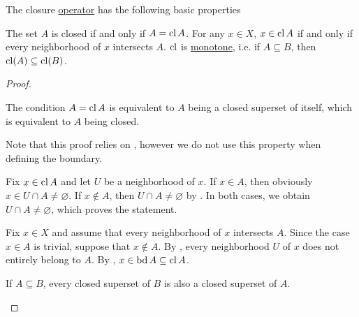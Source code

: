 \begin{proposition}\label{thm:closure_operator_properties}
  The closure \hyperref[def:closure_operator]{operator} has the following basic properties
  \begin{propenum}
     The set \( A \) is closed if and only if \( A = \operatorname{cl} A \).
     For any \( x \in X \), \( x \in \operatorname{cl} A \) if and only if every neighborhood of \( x \) intersects \( A \).
     \( \operatorname{cl} \) is \hyperref[def:monotone_map]{monotone}, i.e. if \( A \subseteq B \), then \( \operatorname{cl}(A) \subseteq \operatorname{cl}(B) \).
  \end{propenum}
\end{proposition}
\begin{proof}\mbox{}
  \begin{propenum}
     The condition \( A = \operatorname{cl}{A} \) is equivalent to \( A \) being a closed superset of itself, which is equivalent to \( A \) being closed.

     Note that this proof relies on , however we do not use this property when defining the boundary.

    \begin{description}
      \Implies Fix \( x \in \operatorname{cl}{A} \) and let \( U \) be a neighborhood of \( x \). If \( x \in A \), then obviously \( x \in U \cap A \neq \varnothing \). If \( x \not\in A \), then \( U \cap A \neq \varnothing \) by . In both cases, we obtain \( U \cap A \neq \varnothing \), which proves the statement.

      \ImpliedBy Fix \( x \in X \) and assume that every neighborhood of \( x \) intersects \( A \). Since the case \( x \in A \) is trivial, suppose that \( x \not\in A \). By , every neighborhood \( U \) of \( x \) does not entirely belong to \( A \). By , \( x \in \operatorname{bd} A \subseteq \operatorname{cl} A \).
    \end{description}

     If \( A \subseteq B \), every closed superset of \( B \) is also a closed superset of \( A \).
  \end{propenum}
\end{proof}


